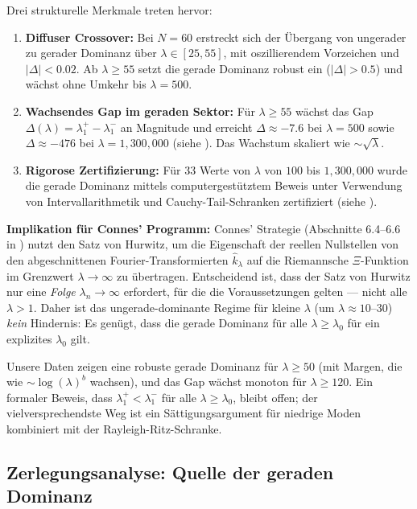 \documentclass[12pt,a4paper]{article}
\theoremstyle{definition}
\theoremstyle{remark}
\begin{document}
Drei strukturelle Merkmale treten hervor:

\begin{enumerate}
  \item \textbf{Diffuser Crossover:} Bei $N=60$ erstreckt sich der Übergang von ungerader zu gerader Dominanz über $\lambda \in [25, 55]$, mit oszillierendem Vorzeichen und $|\Delta| < 0.02$. Ab $\lambda \geq 55$ setzt die gerade Dominanz robust ein ($|\Delta| > 0.5$) und wächst ohne Umkehr bis $\lambda = 500$.

  \item \textbf{Wachsendes Gap im geraden Sektor:} Für $\lambda \geq 55$ wächst das Gap $\Delta(\lambda) = \lambda_1^+ - \lambda_1^-$ an Magnitude und erreicht $\Delta \approx -7.6$ bei $\lambda = 500$ sowie $\Delta \approx -476$ bei $\lambda = 1{,}300{,}000$ (siehe ). Das Wachstum skaliert wie $\sim\!\sqrt{\lambda}$.

  \item \textbf{Rigorose Zertifizierung:} Für $33$ Werte von $\lambda$ von $100$ bis $1{,}300{,}000$ wurde die gerade Dominanz mittels computergestütztem Beweis unter Verwendung von Intervallarithmetik und Cauchy-Tail-Schranken zertifiziert (siehe ).
\end{enumerate}

\textbf{Implikation für Connes' Programm:} Connes' Strategie (Abschnitte 6.4--6.6 in \cite{Connes2025}) nutzt den Satz von Hurwitz, um die Eigenschaft der reellen Nullstellen von den abgeschnittenen Fourier-Transformierten $\hat{k}_\lambda$ auf die Riemannsche $\Xi$-Funktion im Grenzwert $\lambda \to \infty$ zu übertragen. Entscheidend ist, dass der Satz von Hurwitz nur eine \emph{Folge} $\lambda_n \to \infty$ erfordert, für die die Voraussetzungen gelten --- nicht alle $\lambda > 1$. Daher ist das ungerade-dominante Regime für kleine $\lambda$ (um $\lambda \approx 10$--$30$) \emph{kein} Hindernis: Es genügt, dass die gerade Dominanz für alle $\lambda \geq \lambda_0$ für ein explizites $\lambda_0$ gilt.

Unsere Daten zeigen eine robuste gerade Dominanz für $\lambda \geq 50$ (mit Margen, die wie $\sim \log(\lambda)^b$ wachsen), und das Gap wächst monoton für $\lambda \geq 120$. Ein formaler Beweis, dass $\lambda_1^+ < \lambda_1^-$ für alle $\lambda \geq \lambda_0$, bleibt offen; der vielversprechendste Weg ist ein Sättigungsargument für niedrige Moden kombiniert mit der Rayleigh-Ritz-Schranke.

\subsection{Zerlegungsanalyse: Quelle der geraden Dominanz}
\end{document}
